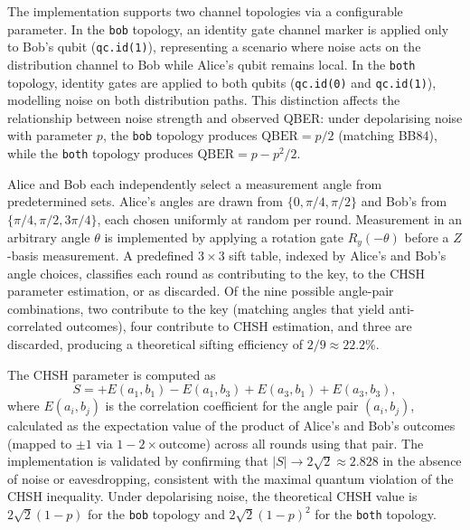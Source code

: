 \documentclass[10pt, a4paper]{report}
\begin{document}
The implementation supports two channel topologies via a configurable parameter. In the \texttt{bob} topology, an identity gate channel marker is applied only to Bob's qubit (\texttt{qc.id(1)}), representing a scenario where noise acts on the distribution channel to Bob while Alice's qubit remains local. In the \texttt{both} topology, identity gates are applied to both qubits (\texttt{qc.id(0)} and \texttt{qc.id(1)}), modelling noise on both distribution paths. This distinction affects the relationship between noise strength and observed QBER: under depolarising noise with parameter $p$, the \texttt{bob} topology produces $\text{QBER} = p/2$ (matching BB84), while the \texttt{both} topology produces $\text{QBER} = p - p^2/2$.

Alice and Bob each independently select a measurement angle from predetermined sets. Alice's angles are drawn from $\{0, \pi/4, \pi/2\}$ and Bob's from $\{\pi/4, \pi/2, 3\pi/4\}$, each chosen uniformly at random per round. Measurement in an arbitrary angle $\theta$ is implemented by applying a rotation gate $R_y(-\theta)$ before a $Z$-basis measurement. A predefined $3 \times 3$ sift table, indexed by Alice's and Bob's angle choices, classifies each round as contributing to the key, to the CHSH parameter estimation, or as discarded. Of the nine possible angle-pair combinations, two contribute to the key (matching angles that yield anti-correlated outcomes), four contribute to CHSH estimation, and three are discarded, producing a theoretical sifting efficiency of $2/9 \approx 22.2\%$.

The CHSH parameter is computed as
%
\begin{equation}
\label{eq:chsh-computation}
S = +E(a_1, b_1) - E(a_1, b_3) + E(a_3, b_1) + E(a_3, b_3),
\end{equation}
%
where $E(a_i, b_j)$ is the correlation coefficient for the angle pair $(a_i, b_j)$, calculated as the expectation value of the product of Alice's and Bob's outcomes (mapped to $\pm 1$ via $1 - 2 \times \text{outcome}$) across all rounds using that pair. The implementation is validated by confirming that $|S| \rightarrow 2\sqrt{2} \approx 2.828$ in the absence of noise or eavesdropping, consistent with the maximal quantum violation of the CHSH inequality. Under depolarising noise, the theoretical CHSH value is $2\sqrt{2}(1-p)$ for the \texttt{bob} topology and $2\sqrt{2}(1-p)^2$ for the \texttt{both} topology.

% 
\end{document}
